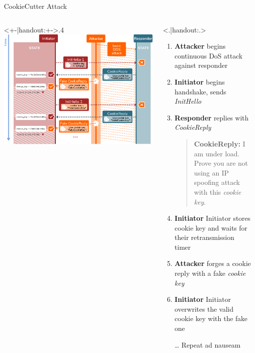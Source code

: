 \begin{frame}{CookieCutter Attack}
    \begin{columns}[fullwidth,T]
      \begin{column}<+-|handout:+->{.4\linewidth}
        \includegraphics[height=.85\textheight]{graphics/cookiecutter-bare}
      \end{column}
      \begin{column}{.4\linewidth}
      \small
      \only<.|handout:.>{
      	\vspace{-\ht\strutbox}
          \begin{enumerate}
            \item \textbf{Attacker} begins continuous DoS attack against responder
            \item \textbf{Initiator} begins handshake, sends \emph{InitHello}
            \item \textbf{Responder} replies with \emph{CookieReply}
              \blockquote{\textbf{CookieReply:} I am under load. Prove you are not using an IP spoofing attack with this \emph{cookie key}.}
            \item \textbf{Initiator} Initiator stores cookie key and waits for their retransmission timer
            \item \textbf{Attacker} forges a cookie reply with a fake \emph{cookie key}
            \item \textbf{Initiator} Initiator overwrites the valid cookie key with the fake one
            \item[…] Repeat ad nauseam
          \end{enumerate}
      }


\end{column}
\end{columns}
\end{frame}
